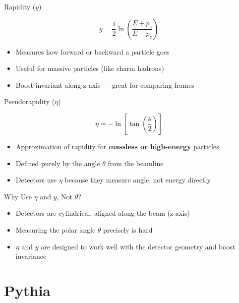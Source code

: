 \documentclass[10pt]{beamer}
\begin{document}
\begin{frame}{Rapidity (\( y \))}

\[
y = \frac{1}{2} \ln\left(\frac{E + p_z}{E - p_z}\right)
\]

\begin{itemize}
    \item Measures how forward or backward a particle goes
    \item Useful for massive particles (like charm hadrons)
    \item Boost-invariant along z-axis — great for comparing frames
\end{itemize}

\end{frame}

\begin{frame}{Pseudorapidity (\( \eta \))}

\[
\eta = -\ln\left[\tan\left(\frac{\theta}{2}\right)\right]
\]

\begin{itemize}
    \item Approximation of rapidity for \textbf{massless or high-energy} particles
    \item Defined purely by the angle \( \theta \) from the beamline
    \item Detectors use \( \eta \) because they measure angle, not energy directly
\end{itemize}

\end{frame}

\begin{frame}{Why Use \( \eta \) and \( y \), Not \( \theta \)?}

\begin{itemize}
    \item Detectors are cylindrical, aligned along the beam (z-axis)
    \item Measuring the polar angle \( \theta \) precisely is hard
    \item \( \eta \) and \( y \) are designed to work well with the detector geometry and boost invariance
\end{itemize}

\end{frame}

\section{Pythia}
\end{document}
